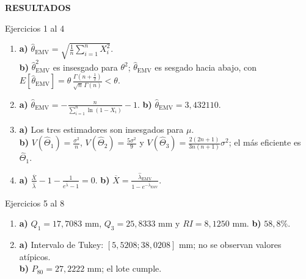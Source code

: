 \documentclass[letterpaper,12pt]{article}
\newenvironment{resultados}{%
    \newpage
    \begin{center}
        \begin{tcolorbox}[
            colback=azulFuerte,
            colframe=azulFuerte,
            colupper=white,
            width=0.8\textwidth,
            center,
            arc=10pt]
            \centering\Large\textbf{RESULTADOS}
        \end{tcolorbox}
    \end{center}
    \small
}{}
\begin{document}
\begin{resultados}

\begin{resultbox}{Ejercicios 1 al 4}
\begin{enumerate}[label=\color{azulFuerte}\bfseries\arabic*.,leftmargin=*,itemsep=0.75em]
    \item \textbf{a)} $\displaystyle \widehat\theta_{\mathrm{EMV}}=\sqrt{\frac1n\sum_{i=1}^n X_i^2}$. \\
          \textbf{b)} $\widehat\theta_{\mathrm{EMV}}^2$ es insesgado para $\theta^2$; $\widehat\theta_{\mathrm{EMV}}$ es sesgado hacia abajo, con $\displaystyle E[\widehat\theta_{\mathrm{EMV}}]=\theta\,\frac{\Gamma(n+\tfrac12)}{\sqrt n\,\Gamma(n)}<\theta$.

    \item \textbf{a)} $\displaystyle \widehat\theta_{\mathrm{EMV}}=-\frac{n}{\sum_{i=1}^n\ln(1-X_i)}-1$. \quad
          \textbf{b)} $\widehat\theta_{\mathrm{EMV}}=3{,}432110$.

    \item \textbf{a)} Los tres estimadores son insesgados para $\mu$. \\
          \textbf{b)} $\displaystyle V(\widehat\Theta_1)=\frac{\sigma^2}{n}$, $\displaystyle V(\widehat\Theta_2)=\frac{5\sigma^2}{9}$ y $\displaystyle V(\widehat\Theta_3)=\frac{2(2n+1)}{3n(n+1)}\sigma^2$; el más eficiente es $\widehat\Theta_1$.

    \item \textbf{a)} $\displaystyle \frac{\overline X}{\widehat\lambda}-1-\frac{1}{e^{\widehat\lambda}-1}=0$. \quad
          \textbf{b)} $\displaystyle \overline X=\frac{\widehat\lambda_{\mathrm{EMV}}}{1-e^{-\widehat\lambda_{\mathrm{EMV}}}}$.
\end{enumerate}
\end{resultbox}

\begin{resultbox}{Ejercicios 5 al 8}
\begin{enumerate}[label=\color{azulFuerte}\bfseries\arabic*.,start=5,leftmargin=*,itemsep=0.75em]
    \item \textbf{a)} $Q_1=17{,}7083$ mm, $Q_3=25{,}8333$ mm y $RI=8{,}1250$ mm. \quad
          \textbf{b)} $58{,}8\%$.

    \item \textbf{a)} Intervalo de Tukey: $[5{,}5208;38{,}0208]$ mm; no se observan valores atípicos. \\
          \textbf{b)} $P_{80}=27{,}2222$ mm; el lote cumple.


\end{enumerate}
\end{resultbox}
\end{resultados}
\end{document}

